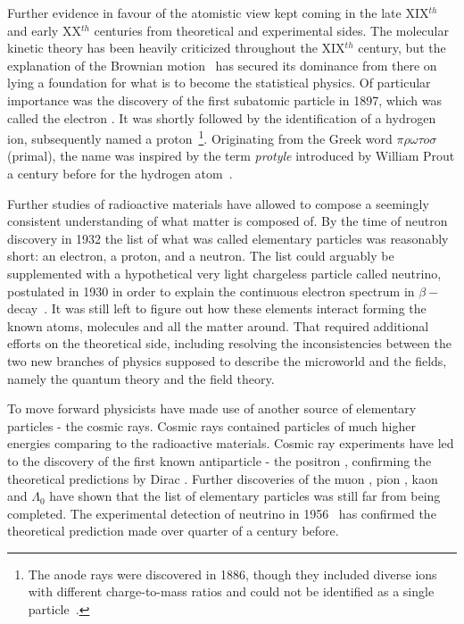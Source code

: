 Further evidence in favour of the atomistic view kept coming in the late XIX$^{th}$ and early XX$^{th}$ centuries from theoretical and experimental sides. The molecular kinetic theory has been heavily criticized throughout the XIX$^{th}$ century, but the explanation of the Brownian motion~\cite{brownian} has secured its dominance from there on lying a foundation for what is to become the statistical physics. Of particular importance was the discovery of the first subatomic particle in 1897, which was called the electron \cite{cathode}. It was shortly followed by the identification of a hydrogen ion, subsequently named a proton~\cite{proton_discovery}\footnote{The anode rays were discovered in 1886, though they included diverse ions with different charge-to-mass ratios and could not be identified as a single particle~\cite{anode_rays}.}. Originating from the Greek word $\pi \rho \omega \tau o \sigma$ (primal), the name was inspired by the term \textit{protyle} introduced by William Prout a century before for the hydrogen atom~\cite{prout}.

Further studies of radioactive materials have allowed to compose a seemingly consistent understanding of what matter is composed of. By the time of neutron discovery in 1932 \cite{neutron} the list of what was called elementary particles was reasonably short: an electron, a proton, and a neutron. The list could arguably be supplemented with a hypothetical very light chargeless particle called neutrino, postulated in 1930 in order to explain the continuous electron spectrum in $\beta-$decay~\cite{pauli_neutrino}. It was still left to figure out how these elements interact forming the known atoms, molecules and all the matter around. That required additional efforts on the theoretical side, including resolving the inconsistencies between the two new branches of physics supposed to describe the microworld and the fields, namely the quantum theory and the field theory. 

To move forward physicists have made use of another source of elementary particles - the cosmic rays. Cosmic rays contained particles of much higher energies comparing to the radioactive materials. Cosmic ray experiments have led to the discovery of the first known antiparticle - the positron \cite{positron_exp}, confirming the theoretical predictions by Dirac \cite{positron_th}. Further discoveries of the muon \cite{muon_exp}, pion \cite{pion}, kaon \cite{kaon} and $\Lambda_0$ \cite{lambda0} have shown that the list of elementary particles was still far from being completed. The experimental detection of neutrino in 1956~\cite{neutrino} has confirmed the theoretical prediction made over quarter of a century before.  

